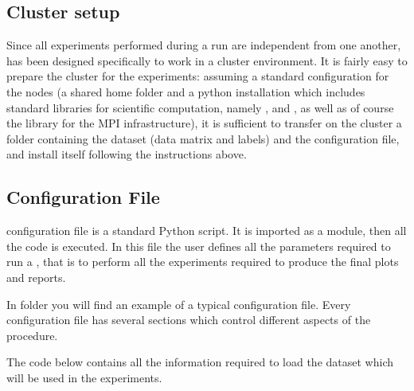 \documentclass[letterpaper,10pt,english]{sphinxmanual}
\begin{document}
\subsection{Cluster setup}
\label{\detokenize{tutorial:id1}}\label{\detokenize{tutorial:cluster-setup}}
Since all experiments performed during a run are independent from one another,  has been designed specifically to work in a cluster environment.
It is fairly easy to prepare the cluster for the experiments: assuming a standard configuration for the nodes (a shared home folder and a python installation which includes standard libraries for scientific computation, namely ,  and , as well as of course the  library for the MPI infrastructure), it is sufficient to transfer on the cluster a folder containing the dataset (data matrix and labels) and the configuration file, and install  itself following the instructions above.
\begin{quote}
\end{quote}


\subsection{Configuration File}
\label{\detokenize{tutorial:configuration-file}}\label{\detokenize{tutorial:configuration}}
 configuration file is a standard Python script. It is
imported as a module, then all the code is executed. In this file the user defines all the parameters required to run a , that is to perform all the experiments required to produce the final plots and reports.

In folder  you will find an example of a typical configuration file.
Every configuration file has several sections which control different aspects of the procedure.

The code below contains all the information required to load the dataset which will be used in the experiments.
\end{document}
